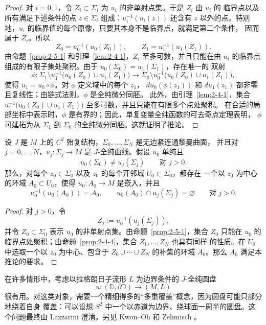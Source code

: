 \begin{proof}
对 $i=0,1$，令 $Z_i\subset\Sigma_i$ 为 $u_i$ 的非单射点集。于是 $Z_i$ 由 $u_i$ 的
临界点以及所有满足下述条件的点 $z\in\Sigma_i$ 组成：$u_i^{-1}(u_i(z))$ 还含有 $z$
以外的点。特别地，$u_i$ 的临界值的每个原像，只要其本身不是临界点，就满足第二个条件，
因而属于 $Z_i$。所以
\[
  Z_0=u_0^{-1}(u_0(Z_0)),
  \qquad
  Z_1=u_1^{-1}(u_1(Z_1)).
\]
由命题~\ref{prop:2-5-1} 和引理~\ref{lem:2-4-1}，$Z_i$ 至多可数，并且只能在由
$u_i$ 的临界点组成的有限子集处聚积。由于 $u_0(\Sigma_0)=u_1(\Sigma_1)$，存在唯一的
双射
\[
  \phi:
  \Sigma_1\setminus u_1^{-1}\bigl(u_0(Z_0)\cup u_1(Z_1)\bigr)
  \longrightarrow
  \Sigma_0\setminus u_0^{-1}\bigl(u_0(Z_0)\cup u_1(Z_1)\bigr),
\]
使得 $u_1=u_0\circ\phi$。对 $\phi$ 定义域中的每个 $z_1$，
$du_0(\phi(z_1))$ 和 $du_1(z_1)$ 都非零且复线性；由链式法则，$\phi$ 是全纯微分同胚。
此外，由引理~\ref{lem:2-4-1}，集合
$u_1^{-1}\bigl(u_0(Z_0)\cup u_1(Z_1)\bigr)$ 至多可数，并且只能在有限多个点处聚积。
在合适的局部坐标中表示时，$\phi$ 是有界的；因此，单复变量全纯函数的可去奇点定理表明，
$\phi$ 可延拓为从 $\Sigma_1$ 到 $\Sigma_0$ 的全纯微分同胚。这就证明了推论。
\end{proof}

\begin{corollary}\label{cor:2-5-5}
设 $J$ 是 $M$ 上的 $C^2$ 殆复结构，$\Sigma_0,\ldots,\Sigma_N$ 是无边紧连通黎曼曲面，
并且对 $j=0,\ldots,N$，$u_j:\Sigma_j\to M$ 是 $J$-全纯曲线。假设 $u_0$ 单纯且
\[
  u_0(\Sigma_0)\ne u_j(\Sigma_j)
  \qquad\text{对 }j>0.
\]
那么，对每个 $z_0\in\Sigma_0$ 以及 $z_0$ 的每个开邻域 $U_0\subset\Sigma_0$，都存在
一个以 $z_0$ 为中心的环域 $A_0\subset U_0$，使得 $u_0:A_0\to M$ 是嵌入，并且
\[
  u_0^{-1}(u_0(A_0))=A_0,
  \qquad
  u_0(A_0)\cap u_j(\Sigma_j)=\varnothing
  \qquad\text{对 }j>0.
\]
\end{corollary}

\begin{proof}
对 $j>0$，令
\[
  Z_j:=u_0^{-1}(u_j(\Sigma_j)),
\]
并令 $Z_0\subset\Sigma_0$ 表示 $u_0$ 的非单射点集。由命题~\ref{prop:2-5-1}，集合
$Z_0$ 只能在 $u_0$ 的临界点处聚积；由命题~\ref{prop:2-4-4}，集合
$Z_1,\ldots,Z_N$ 也具有同样
的性质。在 $U_0$ 中选取一个以 $z_0$ 为中心、包含于
$Z_0\cup\cdots\cup Z_N$ 的补集的环域 $A_0$。那么 $A_0$ 满足本推论的要求。
\end{proof}

\begin{remark}\label{rem:2-5-6}
在许多情形中，考虑以拉格朗日子流形 $L$ 为边界条件的 $J$-全纯圆盘
\[
  u:(\mathbb D,\partial\mathbb D)\longrightarrow(M,L)
\]
很有用。对这类对象，需要一个精细得多的“多重覆盖”概念，因为圆盘可能只部分地绕着自身
覆盖：可以设想 $S^2$ 中一个以赤道为边界、绕球面一周半的圆盘。这个问题最终由
Lazzarini  澄清。另见 Kwon--Oh  和
Zehmisch 。
\end{remark}
